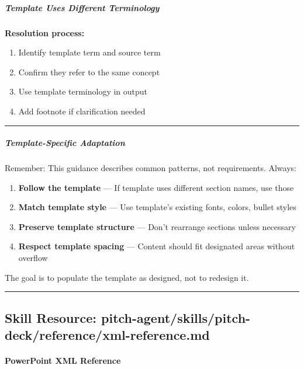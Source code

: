 \documentclass[11pt]{article}
\begin{document}
\subparagraph{Template Uses Different Terminology}\mbox{}\par

\textbf{Resolution process:}

\begin{enumerate}[leftmargin=*,itemsep=2pt,topsep=2pt]
\item {} Identify template term and source term
\item {} Confirm they refer to the same concept
\item {} Use template terminology in output
\item {} Add footnote if clarification needed
\end{enumerate}

\vspace{0.5em}\hrule\vspace{0.5em}

\subparagraph{Template-Specific Adaptation}\mbox{}\par

Remember: This guidance describes common patterns, not requirements. Always:


\begin{enumerate}[leftmargin=*,itemsep=2pt,topsep=2pt]
\item {} \textbf{Follow the template} — If template uses different section names, use those
\item {} \textbf{Match template style} — Use template's existing fonts, colors, bullet styles
\item {} \textbf{Preserve template structure} — Don't rearrange sections unless necessary
\item {} \textbf{Respect template spacing} — Content should fit designated areas without overflow
\end{enumerate}

The goal is to populate the template as designed, not to redesign it.


\vspace{0.8em}\hrule\vspace{0.8em}

\subsection{Skill Resource: pitch-agent/skills/pitch-deck/reference/xml-reference.md}\label{file:pitch-agent-skills-pitch-deck-reference-xml-reference-md}

\paragraph{PowerPoint XML Reference}\mbox{}\par
\end{document}
